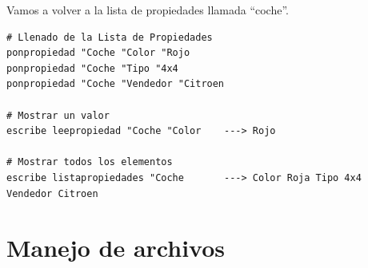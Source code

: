 Vamos a volver a la lista de propiedades llamada ``coche''.
\begin{verbatim}
# Llenado de la Lista de Propiedades 
ponpropiedad "Coche "Color "Rojo
ponpropiedad "Coche "Tipo "4x4
ponpropiedad "Coche "Vendedor "Citroen

# Mostrar un valor
escribe leepropiedad "Coche "Color    ---> Rojo

# Mostrar todos los elementos 
escribe listapropiedades "Coche       ---> Color Roja Tipo 4x4 Vendedor Citroen\end{verbatim}

\section{Manejo de archivos}
   \label{Manejo-de-Archivos}

